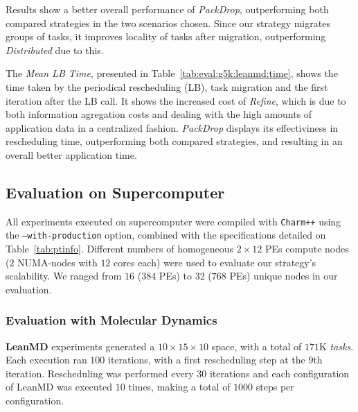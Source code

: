 Results show a better overall performance of \textit{PackDrop}, outperforming both compared strategies in the two scenarios chosen.
Since our strategy migrates groups of tasks, it improves locality of tasks after migration, outperforming \textit{Distributed} due to this.

The \textit{Mean LB Time}, presented in Table~\ref{tab:eval:g5k:leanmd:time}, shows the time taken by the periodical rescheduling (LB), task migration and the first iteration after the LB call.
It shows the increased cost of \textit{Refine}, which is due to both information agregation costs and dealing with the high amounts of application data in a centralized fashion.
\textit{PackDrop} displays its effectiviness in rescheduling time, outperforming both compared strategies, and resulting in an overall better application time. 

\subsection{Evaluation on Supercomputer} \label{sec:sdumont}

All experiments executed on supercomputer were compiled with \texttt{Charm++} using the \texttt{--with-production} option, combined with the specifications detailed on Table~\ref{tab:ptinfo}.
Different numbers of homogeneous $2\times 12$ PEs compute nodes ($2$ NUMA-nodes with $12$ cores each) were used to evaluate our strategy's scalability.
We ranged from $16$ ($384$ PEs) to $32$ ($768$ PEs) unique nodes in our evaluation. 

\subsubsection{Evaluation with Molecular Dynamics} \label{sec:sdumont:md}

\textbf{LeanMD} experiments generated a $10\times15\times10$ space, with a total of $171$K \textit{tasks}.
Each execution ran $100$ iterations, with a first rescheduling step at the $9$th iteration. 
Rescheduling was performed every $30$ iterations and each configuration of LeanMD was executed $10$ times, making a total of $1000$ steps per configuration. 

%	


